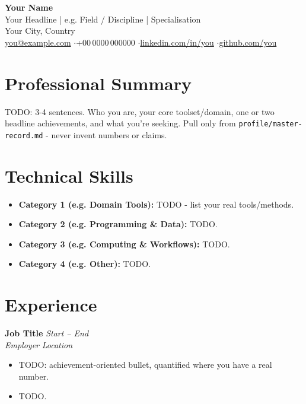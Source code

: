 \documentclass[a4paper,11pt]{article}
\newcommand{\entry}[4]{%
  \noindent\textbf{#1} \hfill \textit{#2} \\
  \textit{#3} \hfill \textit{#4} \par\vspace{1pt}
}
\begin{document}
\begin{center}
    {\Huge \textbf{Your Name}} \\[6pt]
    {\large Your Headline | e.g. Field / Discipline | Specialisation} \\[4pt]
    {\color{grey} Your City, Country} \\[3pt]
    \href{mailto:you@example.com}{you@example.com} \enspace$\cdot$\enspace +00\,0000\,000000 \enspace$\cdot$\enspace \href{https://www.linkedin.com/in/you/}{linkedin.com/in/you} \enspace$\cdot$\enspace \href{https://github.com/you}{github.com/you}
\end{center}

\vspace{2pt}

\section{Professional Summary}

TODO: 3-4 sentences. Who you are, your core toolset/domain, one or two headline
achievements, and what you're seeking. Pull only from \texttt{profile/master-record.md} -
never invent numbers or claims.

\section{Technical Skills}
\begin{itemize}[noitemsep,topsep=2pt,leftmargin=1.5em]
    \item \textbf{Category 1 (e.g. Domain Tools):} TODO - list your real tools/methods.
    \item \textbf{Category 2 (e.g. Programming \& Data):} TODO.
    \item \textbf{Category 3 (e.g. Computing \& Workflows):} TODO.
    \item \textbf{Category 4 (e.g. Other):} TODO.
\end{itemize}

\section{Experience}

\entry{Job Title}{Start -- End}{Employer}{Location}
\begin{itemize}[noitemsep,topsep=2pt,leftmargin=1.5em]
    \item TODO: achievement-oriented bullet, quantified where you have a real number.
    \item TODO.
\end{itemize}
\vspace{2pt}
\end{document}
